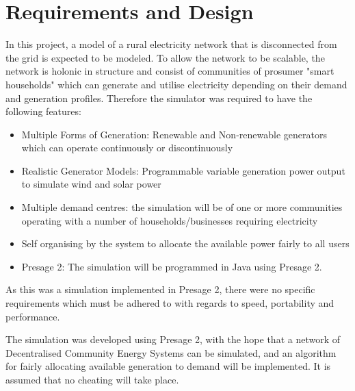 \chapter{Requirements and Design}
\label{Requirements and Design}
In this project, a model of a rural electricity network that is disconnected from the grid is expected to be modeled. To allow the network to be scalable, the network is holonic in structure and consist of communities of prosumer "smart households" which can generate and utilise electricity depending on their demand and generation profiles. Therefore the simulator was required to have the following features:
\begin{itemize}
  \item Multiple Forms of Generation: Renewable and Non-renewable generators which can operate continuously or discontinuously
  \item Realistic Generator Models: Programmable variable generation power output to simulate wind and solar power
  \item Multiple demand centres: the simulation will be of one or more communities operating with a number of households/businesses requiring electricity
  \item Self organising by the system to allocate the available power fairly to all users
  \item Presage 2: The simulation will be programmed in Java using Presage 2.
\end{itemize}

As this was a simulation implemented in Presage 2, there were no specific requirements which must be adhered to with regards to speed, portability and performance.  

The simulation was developed using Presage 2, with the hope that a network of Decentralised Community Energy Systems can be simulated, and an algorithm for fairly allocating available generation to demand will be implemented. It is assumed that no cheating will take place.

